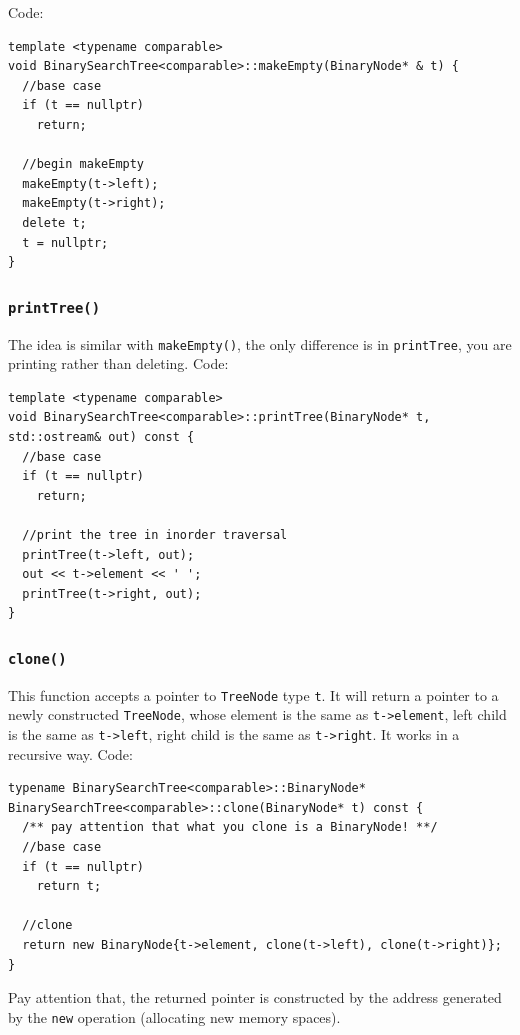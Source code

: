 \documentclass[12pt]{book}
\begin{document}
Code:
\begin{verbatim}
template <typename comparable>
void BinarySearchTree<comparable>::makeEmpty(BinaryNode* & t) {
  //base case 
  if (t == nullptr)
    return;

  //begin makeEmpty
  makeEmpty(t->left);
  makeEmpty(t->right);
  delete t;
  t = nullptr;
}
\end{verbatim}

\subsubsection{\texttt{printTree()}}
\label{sec:org4692747}
The idea is similar with \texttt{makeEmpty()}, the only difference is in \texttt{printTree}, you are printing rather than deleting. Code:
\begin{verbatim}
template <typename comparable>
void BinarySearchTree<comparable>::printTree(BinaryNode* t, std::ostream& out) const {
  //base case 
  if (t == nullptr)
    return;

  //print the tree in inorder traversal
  printTree(t->left, out);
  out << t->element << ' ';
  printTree(t->right, out);
}
\end{verbatim}

\subsubsection{\texttt{clone()}}
\label{sec:org407dd6a}
This function accepts a pointer to \texttt{TreeNode} type \texttt{t}. It will return a pointer to a newly constructed \texttt{TreeNode}, whose element is the same as \texttt{t->element}, left child is the same as \texttt{t->left}, right child is the same as \texttt{t->right}. It works in a recursive way. Code:
\begin{verbatim}
typename BinarySearchTree<comparable>::BinaryNode* BinarySearchTree<comparable>::clone(BinaryNode* t) const {
  /** pay attention that what you clone is a BinaryNode! **/
  //base case 
  if (t == nullptr)
    return t;

  //clone 
  return new BinaryNode{t->element, clone(t->left), clone(t->right)};
}
\end{verbatim}

Pay attention that, the returned pointer is constructed by the address generated by the \texttt{new} operation (allocating new memory spaces).
\end{document}
